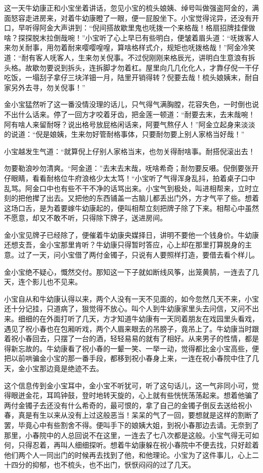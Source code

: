 \documentclass[12pt,UTF8]{ctexbook}
\begin{document}
{{{这一天牛幼康正和小宝坐着讲话，忽见小宝的梳头娘姨、绰号叫做强盗阿金的，满面怒容走进房来，对着牛幼康瞪了一眼，便一屁股坐下。小宝觉得诧异，还没有开口，早听得阿金大声讲到：“倪间搭故歇里鬼也呒拨一个来格哉！格扇招牌挂俚做啥？探探脱末拉倒哉啘！”小宝听了心上早已有些明白，便皱着眉头道：“呒拨客人来勿关耐事，用勿着耐来嘤嘤喤喤，算啥格样式介，规矩也呒拨格哉！”阿金冷笑道：“耐有客人呒客人，生来勿关倪事。不过倪刚刚来格辰光，讲明白生意浪有拆头格。故歇勿要说到拆头，连拆脚才勿着杠。屋里向几几化化人，才靠仔倪一干仔吃饭，一塌刮子拿仔三块洋钿一月，陆里开销得转？倪要去哉！梳头娘姨末，耐自家另外去寻，勿关倪事！”

金小宝猛然听了这一番没情没理的话儿，只气得气满胸膛，花容失色，一时倒也说不出什么话来。停了一回方才咬着牙齿，把金莲一顿道：“耐要去末，去末哉啘！阿有啥人来留耐呀？说出格号放屁格闲话来，阿要气熬仔人！”阿金立起身来淡淡的说道：“倪是娘姨，生来勿好管耐格事体，只要耐勿要上别人家格当好哉！”

小宝越发生气道：“就算倪上仔别人家格当末，也勿关得耐啥事。耐搭倪滚出去！

勿要勒浪吵勿清爽。“阿金道：”去末去末哉，呒啥希奇；耐勿要反嗫。倪倒要张开仔眼睛，看看耐格位牛府浪格少太太笃！“小宝听了气得浑身乱抖，拍着桌子口中乱骂。阿金口中也有些不干不净的话骂出来。小宝气到极处，叫进相帮来，立时立刻的把他撵了出去。又把他的东西铺盖一古脑儿都丢出门外，方才气平了些。想着这场口舌，是为着要嫁牛幼康起的，便叫相帮立刻把牌子除了下来。相帮心中虽然不愿意，却又不敢不听，只得除下牌子，送进房间。

金小宝见牌子已经除了，便催着牛幼康央媒择日，讲明不要他一个钱身价。牛幼康还想支吾，金小宝那里肯听？牛幼康只得暂时答应，心上却在那里打算脱身的主意。过了一天，问小宝借了两付金镯子，只说有人要照样打造，要借去看个样儿。

金小宝绝不疑心，慨然交付。那知这一下子就如断线风筝，出笼黄鹄，一连去了几天，连个影儿也不见来。

小宝自从和牛幼康认得以来，两个人没有一天不见面的，如今忽然几天不来，小宝还十分记挂，只道病了，狠觉得不放心。叫个人到牛幼康家里头去问信，又问不出来。细细的在外面打听了几天，方才知道牛幼康有一天同着朋友在戏园里头看戏，遇见了祝小春也在包厢听戏，两个人眉来眼去的吊膀子，竟吊上了。牛幼康当时跟着祝小春回去，只摆了一台的酒，轻轻易易的就有了相好。从来男子的性情，都是得新忘故的。牛幼康看了祝小春的一颦一笑、一举一动，觉得都比金小宝高些，便把以前哄骗金小宝的那一番手段，都移到祝小春身上来，一连在祝小春院中住了几天，金小宝那边竟是绝迹不去。

这个信息传到金小宝耳中，金小宝不听犹可，听了这句话儿，这一气非同小可，觉得眼迸金花，耳鸣钟鼓，登时地转天旋的，心上就有些恍恍荡荡起来。想着他骗了两付金镯子去还没有什么希奇的，最可恨的，拿了自己的金镯子倒反去送给祝小春，真是有生以来从没有上过这般恶当！呆呆的气了一回，要想就是这样的割断了罢，毕竟心中有些割舍不得。便叫手下的娘姨大姐，到祝小春那边去请。无奈到了那里，小春院中的人总回说不在这里，一连去了七八次都是这般。小宝气得无可如何，只得忍着，再叫人细细探听。想着牛幼康躲在祝小春院中不便去找，只好趁着他们两个人一同出门的时候再去找到了他，和他理论。小宝为了这件事儿，心上二十四分的抑郁，也不梳头，也不出门，恹恹闷闷的过了几天。

}}}
\end{document}

